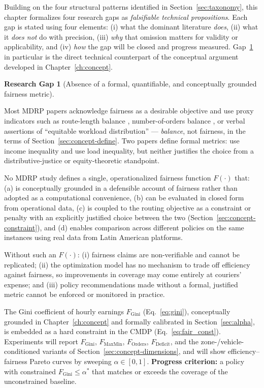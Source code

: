 \documentclass[12pt,a4paper]{report}
\newtheorem{gap}{Research Gap}
\begin{document}
Building on the four structural patterns identified in Section~\ref{sec:taxonomy}, this chapter formalizes four research gaps as \emph{falsifiable technical propositions}. Each gap is stated using four elements: (i) what the dominant literature \emph{does}, (ii) what it \emph{does not} do with precision, (iii) \emph{why} that omission matters for validity or applicability, and (iv) \emph{how} the gap will be closed and progress measured. Gap~\ref{gap:1} in particular is the direct technical counterpart of the conceptual argument developed in Chapter~\ref{ch:concept}.

\begin{gap}[Absence of a formal, quantifiable, and conceptually grounded fairness metric]
\label{gap:1}
\end{gap}
\hfill

Most MDRP papers acknowledge fairness as a desirable objective and use proxy indicators such as route-length balance \citep{jozefowiez2009evolutionary}, number-of-orders balance \citep{ulmer2021restaurant}, or verbal assertions of ``equitable workload distribution'' \citep{liao2020multi} --- \emph{balance}, not fairness, in the terms of Section~\ref{sec:concept-define}. Two papers define formal metrics: \citet{lesmana2019balancing} use income inequality and \citet{sobhanan2024equity} use load inequality, but neither justifies the choice from a distributive-justice or equity-theoretic standpoint.

No MDRP study defines a single, operationalized fairness function $F(\cdot)$ that: (a) is conceptually grounded in a defensible account of fairness rather than adopted as a computational convenience, (b) can be evaluated in closed form from operational data, (c) is coupled to the routing objective as a constraint or penalty with an explicitly justified choice between the two (Section~\ref{sec:concept-constraint}), and (d) enables comparison across different policies on the same instances using real data from Latin American platforms.

Without such an $F(\cdot)$: (i) fairness claims are non-verifiable and cannot be replicated; (ii) the optimization model has no mechanism to trade off efficiency against fairness, so improvements in coverage may come entirely at couriers' expense; and (iii) policy recommendations made without a formal, justified metric cannot be enforced or monitored in practice.

The Gini coefficient of hourly earnings $F_{\text{Gini}}$ (Eq.~\ref{eq:gini}), conceptually grounded in Chapter~\ref{ch:concept} and formally calibrated in Section~\ref{sec:alpha}, is embedded as a hard constraint in the CMDP (Eq.~\ref{eq:fair_const}). Experiments will report $F_{\text{Gini}}$, $F_{\text{MaxMin}}$, $F_{\text{Orders}}$, $F_{\text{Deficit}}$, and the zone-/vehicle-conditioned variants of Section~\ref{sec:concept-dimensions}, and will show efficiency--fairness Pareto curves by sweeping $\alpha \in [0,1]$. \textbf{Progress criterion:} a policy with constrained $F_{\text{Gini}} \leq \alpha^*$ that matches or exceeds the coverage of the unconstrained baseline.
\end{document}
